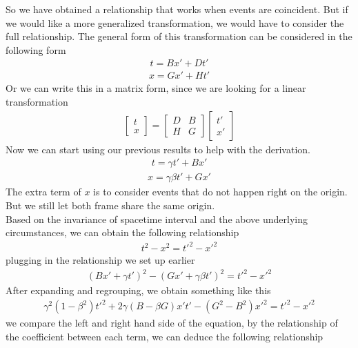 \documentclass[12pt]{book}
\begin{document}
So we have obtained a relationship that works when events are coincident. But if we would like a more generalized transformation, we would have to consider the full relationship. The general form of this transformation can be considered in the following form
\begin{align}
t=Bx'+Dt'
\end{align}
\begin{align}
x=Gx'+Ht'
\end{align}
Or we can write this in a matrix form, since we are looking for a linear transformation
\begin{align}
\begin{bmatrix}
    t \\ x
\end{bmatrix}
=
\begin{bmatrix}
    D&B\\
    H&G
\end{bmatrix}
\begin{bmatrix}
    t'\\ x'
\end{bmatrix}
\end{align}
Now we can start using our previous results to help with the derivation. 
\begin{align}
t = \gamma t' + Bx'
\end{align}
\begin{align}
x=\gamma \beta t' + Gx' 
\end{align}
The extra term of $x$ is to consider events that do not happen right on the origin. But we still let both frame share the same origin.\\
\newline
Based on the invariance of spacetime interval and the above underlying circumstances, we can obtain the following relationship
\begin{align}
t^2 - x^2 = t'^2 - x'^2
\end{align}
plugging in the relationship we set up earlier
\begin{align}
(Bx'+\gamma t')^2 - (Gx' + \gamma \beta t')^2 = t'^2 - x'^2
\end{align}
After expanding and regrouping, we obtain something like this
\begin{align}
\gamma^2(1-\beta^2)t'^2 +2\gamma(B-\beta G)x't' - (G^2 - B^2)x'^2 = t'^2 - x'^2
\end{align}
we compare the left and right hand side of the equation, by the relationship of the coefficient between each term, we can deduce the following relationship
\end{document}
